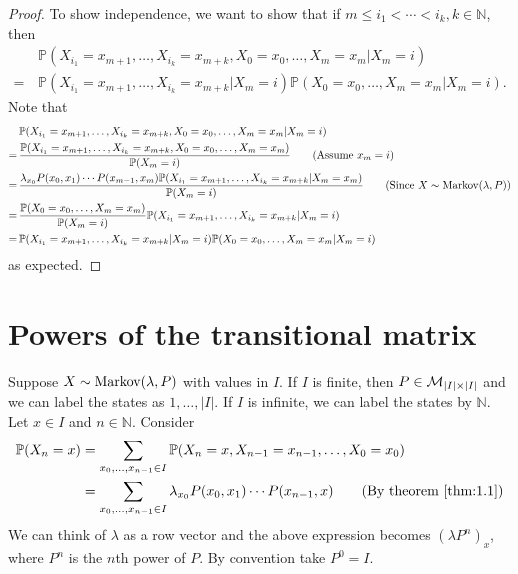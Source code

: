 \documentclass[a4paper]{article}
\begin{document}
\begin{proof}
    To show independence, we want to show that if $ m\le i_1<\cdots<i_k,k\in \mathbb{N}  $, then 
    \begin{align*}
        &\mathbb{P}(X_{i_1}=x_{m+1},\dots,X_{i_k}=x_{m+k},X_0=x_0,\dots,X_m=x_m|X_m=i)\tag{$*$}\\ 
        =\,& \mathbb{P}(X_{i_1}=x_{m+1},\dots,X_{i_k}=x_{m+k}|X_m=i)\mathbb{P}(X_0=x_0,\dots,X_m=x_m|X_m=i).
    \end{align*}
    Note that 
    \begin{align*}
        & \mathbb{P}(X_{i_1}=x_{m+1},\dots,X_{i_k}=x_{m+k},X_0=x_0,\dots,X_m=x_m|X_m=i)\\ 
        =\,& \frac{\mathbb{P}(X_{i_1}=x_{m+1},\dots,X_{i_k}=x_{m+k},X_0=x_0,\dots,X_m=x_m)}{\mathbb{P}(X_m=i)}\tag{Assume $ x_m=i $}\\ 
        =\,& \frac{\lambda_{x_0}P(x_0,x_1)\cdots P(x_{m-1},x_m)\mathbb{P}(X_{i_1}=x_{m+1},\dots,X_{i_k}=x_{m+k}|X_m=x_m)}{\mathbb{P}(X_m=i)}\tag{Since $ X\sim \Markov(\lambda,P) $}\\ 
        =\,& \frac{\mathbb{P}(X_0=x_0,\dots,X_m=x_m)}{\bbP(X_m=i)}\mathbb{P}(X_{i_1}=x_{m+1},\dots,X_{i_k}=x_{m+k}|X_m=i)\\ 
        =\,& \mathbb{P}(X_{i_1}=x_{m+1},\dots,X_{i_k}=x_{m+k}|X_m=i)\mathbb{P}(X_0=x_0,\dots,X_m=x_m|X_m=i)
    \end{align*}
    as expected.
\end{proof}

\section{Powers of the transitional matrix}
Suppose $ X \sim \operatorname{Markov}(\lambda,P) $ with values in $I$. If $I$ is finite, then $ P\in {\mathcal{M}}_{|I|\times |I|} $ and we can label the states as $1,\dots,|I|$. If $I$ is infinite, we can label the states by $ \mathbb{N} $. Let $x\in I$ and $n\in \mathbb{N}$. Consider 
\begin{align*}
    \mathbb{P}(X_n=x)&= \sum_{x_0,\dots,x_{n-1}\in I}\mathbb{P}(X_n=x,X_{n-1}=x_{n-1},\dots,X_0=x_0)\\ 
    &= \sum_{x_0,\dots,x_{n-1}\in I} \lambda_{x_0}P(x_0,x_1)\cdots P(x_{n-1},x)\tag{By theorem \ref{thm:1.1}}
\end{align*}
We can think of $\lambda$ as a row vector and the above expression becomes $ (\lambda P^n)_x $, where $P^n$ is the $n$th power of $P$. By convention take $P^0=I$.
\end{document}
